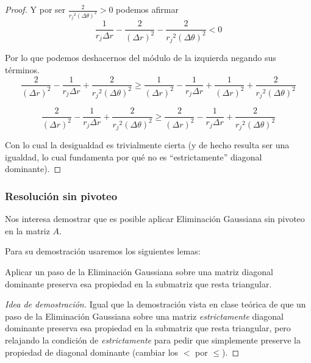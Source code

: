 \begin{proposition}
\begin{proof}
Y por ser $\frac{2}{{r_j}^2 (\Delta \theta)^2} > 0$ podemos afirmar
$$ \frac{1}{r_j \Delta r} - \frac{2}{(\Delta r)^2} - \frac{2}{{r_j}^2 (\Delta \theta)^2} < 0 $$

Por lo que podemos deshacernos del módulo de la izquierda negando sus términos. 
$$\frac{2}{(\Delta r)^2} - \frac{1}{r_j \Delta r} + \frac{2}{{r_j}^2 (\Delta \theta)^2} \geq \frac{1}{(\Delta r)^2} - \frac{1}{r_j \Delta r} + \frac{1}{(\Delta r)^2} + \frac{2}{{r_j}^2(\Delta \theta)^2} $$

$$\frac{2}{(\Delta r)^2} - \frac{1}{r_j \Delta r} + \frac{2}{{r_j}^2 (\Delta \theta)^2} \geq \frac{2}{(\Delta r)^2} - \frac{1}{r_j \Delta r} + \frac{2}{{r_j}^2(\Delta \theta)^2} $$

Con lo cual la desigualdad es trivialmente cierta (y de hecho resulta ser una igualdad, lo cual fundamenta por qué no es ``estrictamente'' diagonal dominante).
\end{proof}
\end{proposition}
\subsubsection{Resolución sin pivoteo}
Nos interesa demostrar que es posible aplicar Eliminación Gaussiana sin pivoteo en la matriz $A$.

Para su demostración usaremos los siguientes lemas:
\begin{lemma}\label{submatriz}
 Aplicar un paso de la Eliminación Gaussiana sobre una matriz diagonal dominante preserva esa propiedad en la submatriz que resta triangular.
\end{lemma}
\begin{proof}[Idea de demostración]
 Igual que la demostración vista en clase teórica de que un paso de la Eliminación Gaussiana sobre una matriz \emph{estrictamente} diagonal dominante preserva esa propiedad en la submatriz que resta triangular, pero relajando la condición de \emph{estrictamente} para pedir que simplemente preserve la propiedad de diagonal dominante (cambiar los $<$ por $\leq$).
\end{proof}

